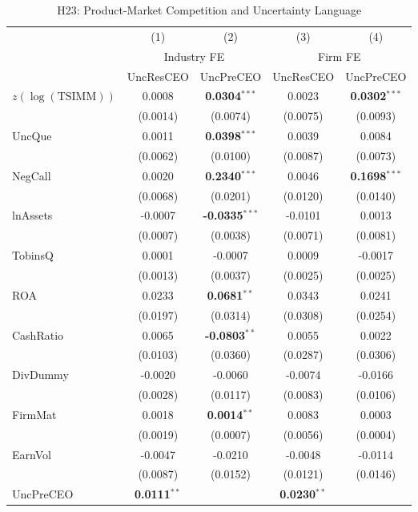 \documentclass[11pt,a4paper]{article}
\begin{document}
\begin{table}[htbp]
\centering
\caption{H23: Product-Market Competition and Uncertainty Language}
\label{tab:h23_competition_uncertainty}
\scriptsize
\begin{tabular}{lcccc}
\toprule
 & (1) & (2) & (3) & (4) \\
 & \multicolumn{2}{c}{Industry FE} & \multicolumn{2}{c}{Firm FE} \\
\cmidrule(lr){2-3} \cmidrule(lr){4-5}
 & UncResCEO & UncPreCEO & UncResCEO & UncPreCEO \\
\midrule
$z(\log(\mathrm{TSIMM}))$ & 0.0008 & \textbf{0.0304}$^{***}$ & 0.0023 & \textbf{0.0302}$^{***}$ \\
 & (0.0014) & (0.0074) & (0.0075) & (0.0093) \\
\midrule
UncQue & 0.0011 & \textbf{0.0398}$^{***}$ & 0.0039 & 0.0084 \\
 & (0.0062) & (0.0100) & (0.0087) & (0.0073) \\
NegCall & 0.0020 & \textbf{0.2340}$^{***}$ & 0.0046 & \textbf{0.1698}$^{***}$ \\
 & (0.0068) & (0.0201) & (0.0120) & (0.0140) \\
lnAssets & -0.0007 & \textbf{-0.0335}$^{***}$ & -0.0101 & 0.0013 \\
 & (0.0007) & (0.0038) & (0.0071) & (0.0081) \\
TobinsQ & 0.0001 & -0.0007 & 0.0009 & -0.0017 \\
 & (0.0013) & (0.0037) & (0.0025) & (0.0025) \\
ROA & 0.0233 & \textbf{0.0681}$^{**}$ & 0.0343 & 0.0241 \\
 & (0.0197) & (0.0314) & (0.0308) & (0.0254) \\
CashRatio & 0.0065 & \textbf{-0.0803}$^{**}$ & 0.0055 & 0.0022 \\
 & (0.0103) & (0.0360) & (0.0287) & (0.0306) \\
DivDummy & -0.0020 & -0.0060 & -0.0074 & -0.0166 \\
 & (0.0028) & (0.0117) & (0.0083) & (0.0106) \\
FirmMat & 0.0018 & \textbf{0.0014}$^{**}$ & 0.0083 & 0.0003 \\
 & (0.0019) & (0.0007) & (0.0056) & (0.0004) \\
EarnVol & -0.0047 & -0.0210 & -0.0048 & -0.0114 \\
 & (0.0087) & (0.0152) & (0.0121) & (0.0146) \\
UncPreCEO & \textbf{0.0111}$^{**}$ &  & \textbf{0.0230}$^{**}$ &  \\

\end{tabular}
\end{table}
\end{document}
